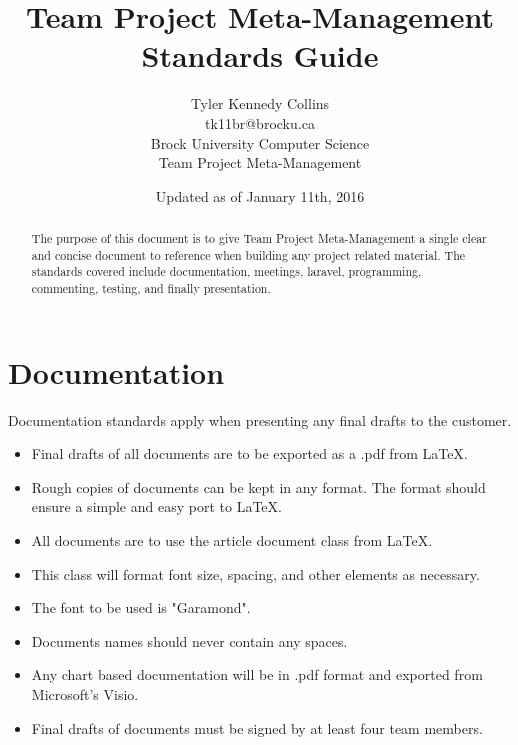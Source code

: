 \documentclass[]{article}
\title{Team Project Meta-Management Standards Guide}
\author{Tyler Kennedy Collins\\ tk11br@brocku.ca\\ Brock University Computer Science\\Team Project Meta-Management\\}
\date{Updated as of January 11th, 2016}
\begin{document}
\maketitle

\thispagestyle{fancy}

\begin{abstract}
The purpose of this document is to give Team Project Meta-Management a single clear and concise document to reference when building any project related material. The standards covered include documentation, meetings, laravel, programming, commenting, testing, and finally presentation.
\end{abstract}

\section{Documentation}
Documentation standards apply when presenting any final drafts to the customer.
\begin{itemize}
	\item Final drafts of all documents are to be exported as a .pdf from LaTeX.
	\item Rough copies of documents can be kept in any format. The format should ensure a simple and easy port to LaTeX.
	\item All documents are to use the article document class from LaTeX.
	\item This class will format font size, spacing, and other elements as necessary.
	\item The font to be used is "Garamond".
	\item Documents names should never contain any spaces.
	\item Any chart based documentation will be in .pdf format and exported from Microsoft's Visio.
	\item Final drafts of documents must be signed by at least four team members.
\end{itemize}
\end{document}
